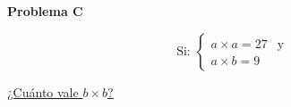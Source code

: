 \begin{center}
\Large \textbf{Problema C} \\
\end{center}

\[
\text{Si: }
\begin{cases} 
    a \times a = 27 & \text{y} \\
    a \times b = 9
\end{cases}
\]

\underline{¿Cuánto vale $b \times b$?}

